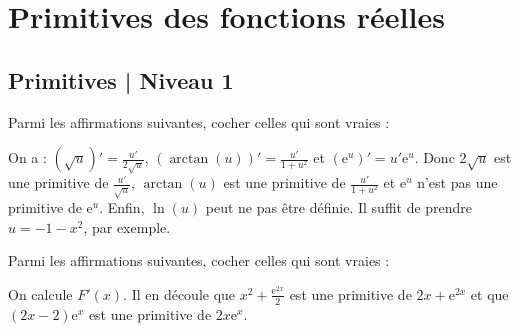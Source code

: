 

\section{Primitives des fonctions réelles}
\subsection{Primitives | Niveau 1}

\begin{question}
Parmi les affirmations suivantes, cocher celles qui sont vraies :
\begin{answers}  
\end{answers}
\begin{explanations}
On a : $\displaystyle (\sqrt{u})'=\frac{u'}{2\sqrt{u}}$, $\displaystyle (\arctan (u))'=\frac{u'}{1+u^2}$ et $\left(\mathrm{e}^u\right)'=u'\mathrm{e}^u$. Donc $\displaystyle 2\sqrt{u}$ est une primitive de $\displaystyle \frac{u'}{\sqrt{u}}$, $\displaystyle \arctan (u)$ est une primitive de $\displaystyle \frac{u'}{1+u^2}$ et $\mathrm{e}^u$ n'est pas une primitive de $\displaystyle \mathrm{e}^u$. Enfin, $\ln (u)$ peut ne pas être définie. Il suffit de prendre $u=-1-x^2$, par exemple.
\end{explanations}
\end{question}

\begin{question}
Parmi les affirmations suivantes, cocher celles qui sont vraies :
\begin{answers}  
\end{answers}
\begin{explanations}
On calcule $F'(x)$. Il en découle que $\displaystyle x^2+\frac{\mathrm{e}^{2x}}{2}$ est une primitive de $\displaystyle 2x+\mathrm{e}^{2x}$ et que $\displaystyle (2x-2)\mathrm{e}^{x}$ est une primitive de $\displaystyle 2x\mathrm{e}^{x}$.
\end{explanations}
\end{question}


